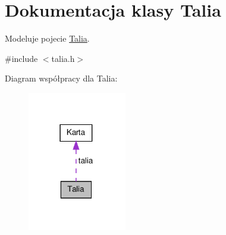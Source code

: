 \hypertarget{class_talia}{\section{Dokumentacja klasy Talia}
\label{class_talia}
}


Modeluje pojecie \hyperlink{class_talia}{Talia}.  




{\ttfamily \#include $<$talia.\-h$>$}



Diagram współpracy dla Talia\-:\nopagebreak
\begin{figure}[H]
\begin{center}
\leavevmode
\includegraphics[width=122pt]{class_talia__coll__graph}
\end{center}
\end{figure}
